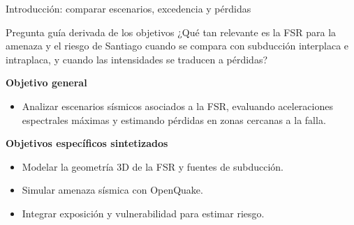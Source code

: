 \documentclass[aspectratio=169,10pt]{beamer}
\newcommand{\tightlist}{\setlength{\itemsep}{0.28em}}
\begin{document}
\begin{frame}[t]{Introducción: comparar escenarios, excedencia y pérdidas}
\begin{block}{Pregunta guía derivada de los objetivos}
¿Qué tan relevante es la FSR para la amenaza y el riesgo de Santiago cuando se compara con subducción interplaca e intraplaca, y cuando las intensidades se traducen a pérdidas?
\end{block}
\vspace{0.2em}
\textbf{Objetivo general}
\begin{itemize}\tightlist
  \item Analizar escenarios sísmicos asociados a la FSR, evaluando aceleraciones espectrales máximas y estimando pérdidas en zonas cercanas a la falla.
\end{itemize}
\textbf{Objetivos específicos sintetizados}
\begin{itemize}\tightlist
  \item Modelar la geometría 3D de la FSR y fuentes de subducción.
  \item Simular amenaza sísmica con OpenQuake.
  \item Integrar exposición y vulnerabilidad para estimar riesgo.
\end{itemize}
\end{frame}
\end{document}
